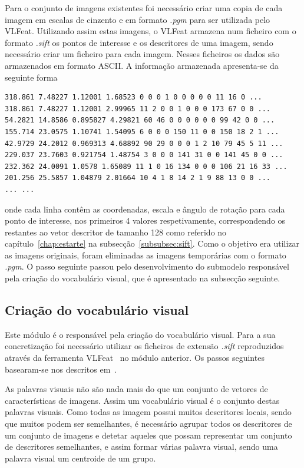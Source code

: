 Para o conjunto de imagens existentes foi necessário criar uma copia de cada imagem em escalas de cinzento e em formato \textit{.pgm} para ser utilizada pelo VLFeat. Utilizando assim estas imagens, o VLFeat armazena num ficheiro com o formato \textit{.sift} os pontos de interesse e os descritores de uma imagem, sendo necessário criar um ficheiro para cada imagem. Nesses ficheiros os dados são armazenados em formato ASCII. 
A informação armazenada apresenta-se da seguinte forma 

\begin{lstlisting}
318.861 7.48227 1.12001 1.68523 0 0 0 1 0 0 0 0 0 11 16 0 ...
318.861 7.48227 1.12001 2.99965 11 2 0 0 1 0 0 0 173 67 0 0 ...
54.2821 14.8586 0.895827 4.29821 60 46 0 0 0 0 0 0 99 42 0 0 ...
155.714 23.0575 1.10741 1.54095 6 0 0 0 150 11 0 0 150 18 2 1 ...
42.9729 24.2012 0.969313 4.68892 90 29 0 0 0 1 2 10 79 45 5 11 ...
229.037 23.7603 0.921754 1.48754 3 0 0 0 141 31 0 0 141 45 0 0 ...
232.362 24.0091 1.0578 1.65089 11 1 0 16 134 0 0 0 106 21 16 33 ...
201.256 25.5857 1.04879 2.01664 10 4 1 8 14 2 1 9 88 13 0 0 ...
... ...
\end{lstlisting}

onde cada linha contêm as coordenadas, escala e ângulo de rotação para cada ponto de interesse, nos primeiros 4 valores respetivamente, correspondendo os restantes ao vetor descritor de tamanho 128 como referido no capítulo~\ref{chap:estarte} na subsecção~\ref{subsubsec:sift}. Como o objetivo era utilizar as imagens originais, foram eliminadas as imagens temporárias com o formato \textit{.pgm}. O passo seguinte passou pelo desenvolvimento do submodelo responsável pela criação do vocabulário visual, que é apresentado na subsecção seguinte.

\subsection{Criação do vocabulário visual}

Este módulo é o responsável pela criação do vocabulário visual. Para a sua concretização foi necessário utilizar os ficheiros de extensão \textit{.sift} reproduzidos através da ferramenta VLFeat~\cite{vedaldi08vlfeat} no módulo anterior. Os passos seguintes basearam-se nos descritos em~\cite{Solem2012}. 

As palavras visuais não são nada mais do que um conjunto de vetores de características de imagens. Assim um vocabulário visual é o conjunto destas palavras visuais. Como todas as imagem possui muitos descritores locais, sendo que muitos podem ser semelhantes, é necessário agrupar todos os descritores de um conjunto de imagens e detetar aqueles que possam representar um conjunto de descritores semelhantes, e assim formar várias palavra visual, sendo uma palavra visual um centroide de um grupo.

